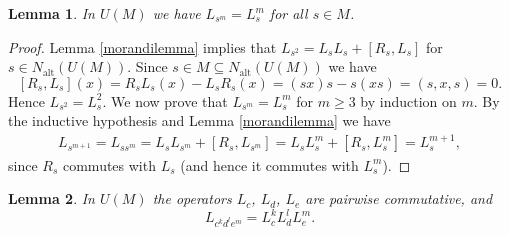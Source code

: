 \documentclass{amsart}
\theoremstyle{plain}
\newtheorem{lemma}{Lemma}[section]
\theoremstyle{definition}
\begin{document}
\begin{lemma}\label{powerofL}
In $U(M)$ we have $L_{s^m} = L_s^m$ for all $s \in M$.
\end{lemma}

\begin{proof}
Lemma \ref{morandilemma} implies that $L_{s^2} = L_s L_s + [R_s, L_s]$ for $s
\in N_{\mathrm{alt}}(U(M))$. Since $s \in M \subseteq N_{\mathrm{alt}}(U(M))$
we have
  \[
  [ R_s, L_s ] (x) = R_s L_s (x) - L_s R_s (x) = (sx)s - s(xs) = (s,x,s) = 0.
  \]
Hence $L_{s^2} = L_s^2$. We now prove that $L_{s^m} = L_s^m$ for $m \ge 3$ by
induction on $m$. By the inductive hypothesis and Lemma \ref{morandilemma} we
have
  \allowdisplaybreaks
  \begin{align*}
  L_{s^{m+1}}
  =
  L_{s s^m}
  =
  L_s L_{s^m} + [ R_s , L_{s^m} ]
  =
  L_s L_s^m + [ R_s, L_s^m ]
  =
  L_s^{m+1},
  \end{align*}
since $R_s$ commutes with $L_s$ (and hence it commutes with $L_s^m$).
\end{proof}

\begin{lemma} \label{cde-operator}
In $U(M)$ the operators $L_c$, $L_d$, $L_e$ are pairwise commutative, and
  \[
  L_{c^k d^l e^m} = L^k_c L^l_d L^m_e.
  \]
\end{lemma}
\end{document}

